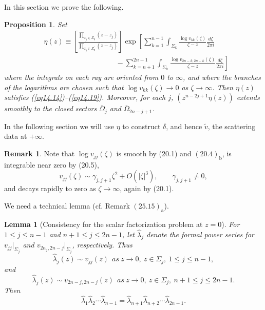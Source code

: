 \documentclass{surv-l}
\theoremstyle{plain}
\newtheorem{prop}[theorem]{Proposition}
\newtheorem{lemma}[theorem]{Lemma}
\theoremstyle{definition}
\newtheorem{remark}[theorem]{Remark}
\numberwithin{equation}{chapter}
\begin{document}
In this section we prove the following.
\renewcommand\thetheorem{31.\arabic{theorem}}
\setcounter{theorem}{2}
\begin{prop}\label{prop31.3}
Set
\setcounter{equation}{3}
\begin{align}\label{eq31.4}
  & \eta(z)\equiv\left[\frac{\prod_{z_{j}\in Z_{\eta}}(z-z_{j})}{\prod_{z_{j}\in Z_{\eta}^{'}}(z-z_{j})}\right]\exp\left[\sum_{k=1}^{n-1}\int_{\Sigma_{k}}\frac{\log v_{kk}(\zeta)}{\zeta-z}\frac{d{\zeta}}{2\pi i}\right.\\ \nonumber
&\qquad\qquad\qquad\qquad\qquad-\left.\sum_{k=n+1}^{2n-1}\int_{\Sigma_{k}}\frac{\log v_{2n-k,2n-k}(\zeta)}{\zeta-z}\frac{d{\zeta}}{2\pi i}\right]
\end{align}
where the integrals on each ray are oriented from $0$ to $\infty$,
and where the branches of the logarithms are chosen such that $\log v_{kk}(\zeta)\rightarrow 0$ as $\zeta \rightarrow\infty$. Then $\eta(z)$ satisfies
\emph{(\ref{eq14.14})}--\emph{(\ref{eq14.19})}. Moreover, for each $j$, $(z^{n-2j+1}\eta(z))$ extends smoothly to the closed sectors $\overline{\Omega}_{j}$ and $\overline{\Omega}_{2n-j+1}$.
\end{prop}
In the following section we will use $\eta$ to construct $\delta$, and hence $\tilde{v}$, the scattering data at $+\infty$.
\setcounter{theorem}{4}
\begin{remark}\label{rem31.5}
Note that $\log v_{jj}(\zeta)$ is smooth by (20.1) and $(20.4)_{\mathrm{b}}$, is integrable near zero by (20.5),
\begin{equation*}
v_{jj}(\zeta)\sim\gamma_{j,j+1}\zeta^{2}+O(|\zeta|^{3}),\qquad \gamma_{j, j+1}\neq 0,
\end{equation*}
and decays rapidly to zero as $\zeta \rightarrow\infty$, again by (20.1).

We need a technical lemma (cf. Remark $(25.15)_{\mathrm{a}}$).
\end{remark}
\begin{lemma}[Consistency for the scalar factorization problem at $z=0$]\label{lem31.6}
For $1\leq j\leq n-1$ and $n+1\leq j\leq 2n-1$, let $\hat{\lambda}_{j}$ denote the formal power series for $v_{j j}|_{{\Sigma}_{j}}$ and $v_{2n_{j},2n-j}|_{{\Sigma}_{j}}$, respectively. Thus
\setcounter{equation}{6}
\begin{equation}\label{eq31.7}
\hat{\lambda}_{j}(z)\sim v_{jj}(z)\ \ as\ z\rightarrow 0,\ z\in{\Sigma}_{j},\ 1\leq j\leq n -1,
\end{equation}
and
\begin{equation}\label{eq31.8}
\hat{\lambda}_{j}(z)\sim v_{2n-j,2n-j}(z)\ \ as\ z\rightarrow 0,\ z\in{\Sigma}_{j},\ n+1\leq j\leq 2n-1.
\end{equation}
Then
\begin{equation}\label{eq31.9}
\hat{\lambda}_{1}\hat{\lambda}_{2}\cdots\hat{\lambda}_{n-1}=\hat{\lambda}_{n+1}\hat{\lambda}_{n+2}\cdots\hat{\lambda}_{2n-1}.
\end{equation}
\end{lemma}
\end{document}
